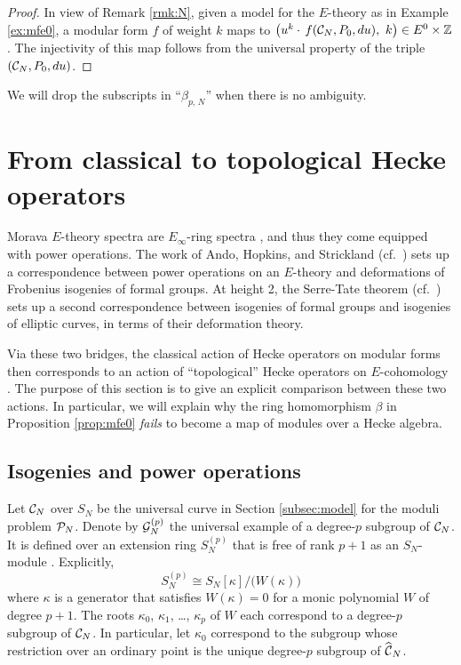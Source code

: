 \documentclass{gtpart}
\theoremstyle{definition}
\theoremstyle{remark}
\newcommand{\mb}[1]{\mathbb{#1}}
\newcommand{\CC}{{\cal C}}
\newcommand{\CG}{{\cal G}}
\newcommand{\CP}{{\cal P}}
\newcommand{\BZ}{{\mb Z}}
\newcommand{\HCC}{\widehat{~\!\!\CC}}
\newcommand{\B}{\beta}
\newcommand{\K}{\kappa}
\renewcommand{\=}{\approx}
\renewcommand{\-}{\sim}
\numberwithin{equation}{section}
\numberwithin{thm}{section}
\begin{document}
\begin{proof}
 In view of Remark \ref{rmk:N}, given a model for the $E$-theory as in Example 
 \ref{ex:mfe0}, a modular form $f$ of weight $k$ maps to 
 $\big( u^k \cdot \, f(\CC_N, P_0, du), ~ k \big) \in E^0 \times \BZ$.  The 
 injectivity of this map follows from the universal property of the triple 
 $(\CC_N, P_0, du)$.  
\end{proof}

We will drop the subscripts in ``$\B_{p,\,N}$'' when there is no ambiguity.  



\section{From classical to topological Hecke operators}
\label{sec:ct}

Morava $E$-theory spectra are $E_\infty$-ring spectra \cite[Corollary 7.6]{GH}, 
and thus they come equipped with power operations.  The work of Ando, Hopkins, 
and Strickland \cite{AHS04} (cf.~\cite[Theorem B]{cong}) sets up a 
correspondence between power operations on an $E$-theory and deformations of 
Frobenius isogenies of formal groups.  At height 2, the Serre-Tate theorem 
\cite{LST} (cf.~\cite[Theorem 2.9.1]{KM}) sets up a second correspondence 
between isogenies of formal groups and isogenies of elliptic curves, in terms of 
their deformation theory.  

Via these two bridges, the classical action of Hecke operators on modular forms 
then corresponds to an action of ``topological'' Hecke operators on 
$E$-cohomology \cite[Section 14]{log}.  The purpose of this section is to give 
an explicit comparison between these two actions.  In particular, we will 
explain why the ring homomorphism $\B$ in Proposition \ref{prop:mfe0} 
{\em fails} to become a map of modules over a Hecke algebra.  



\subsection{Isogenies and power operations}
\label{subsec:po}

Let $\CC_N$ over $S_N$ be the universal curve in Section \ref{subsec:model} for 
the moduli problem $\CP_N$.  Denote by $\CG_N^{(p)}$ the universal example of a 
degree-$p$ subgroup of $\CC_N$.  It is defined over an extension ring 
$S_N^{(p)}$ that is free of rank $p + 1$ as an $S_N$-module 
\cite[Theorem 6.6.1]{KM}.  Explicitly, 
\[
 S_N^{(p)} \cong S_N[\K] / \big(W(\K)\big) 
\]
where $\K$ is a generator that satisfies $W(\K) = 0$ for a monic polynomial $W$ 
of degree $p + 1$.  The roots $\K_0$, $\K_1$, \ldots, $\K_p$ of $W$ each 
correspond to a degree-$p$ subgroup of $\CC_N$.  In particular, let $\K_0$ 
correspond to the subgroup whose restriction over an ordinary point is the 
unique degree-$p$ subgroup of $\HCC_N$.  
\end{document}
